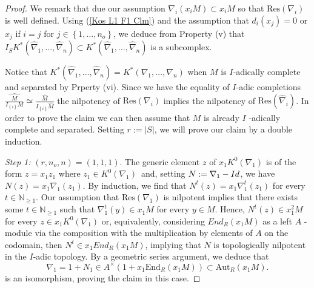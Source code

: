 \documentclass[10pt,a4paper]{amsart}
\begin{document}
\begin{proof} We remark that due our assumption $\nabla_i(x_i M)\subset x_i M$ so that $\mathrm{Res}(\nabla _{i})$ is well defined. Using (\ref{Kos L1 F1 Clm}) and the assumption that $ d_{i}\left( x_{j}\right) =0$ or $x_{j}$ if $i=j$ for $j\in \left\{ 1,\ldots,n_{o}\right\} $, we deduce from Property (v) that $I_{S}K^\ast\left( \widehat{\nabla }_{1},\ldots,\widehat{\nabla }
_{n}\right) \subset K^\ast\left( \widehat{\nabla }_{1},\ldots,\widehat{
\nabla }_{n}\right) $ is a subcomplex.  


Notice that  $K^\ast\left( \widehat{\nabla }_{1},\ldots,\widehat{\nabla }
_{n}\right) =K^\ast\left( \nabla _{1},\ldots,\nabla _{n}\right) $ when $M$
is $I$-adically complete and separated by Prperty (vi). Since we have the equality of $I$-adic completions $\widehat{\frac{M}{I_{\left\{
i\right\} }M}}\simeq \frac{\widehat{M}}{I_{\left\{ i\right\} } \widehat{M}}$
the nilpotency of $\mathrm{Res}\left( \nabla _{i}\right) $
implies the nilpotency of $\mathrm{Res}\left( \widehat{\nabla }_{i}\right) $. 
In order to prove the claim we can then assume that $M$ is already $I$
-adically complete and separated. Setting $r:=\left\vert S\right\vert $, we
will prove our claim by a double induction.

\emph{Step 1: }$\left( r,n_{o},n\right) =\left( 1,1,1\right) $. The generic
element $z$ of $x_{1}K^{0}\left( \nabla _{1}\right) $ is of the form $
z=x_{1}z_{1}$ where $z_{1}\in K^{0}\left( \nabla _{1}\right) $\ and, setting 
$N:=\nabla _{1}-{\rm Id}$, we have $N\left( z\right) =x_{1}\nabla _{1}\left( z_{1}\right) $. By
induction, we find that $N^{t}\left( z\right) =x_{1}\nabla _{1}^{t}\left(
z_{1}\right) $ for every $t\in \mathbb{N}_{\geq 1}$. Our assumption that $
\mathrm{Res}\left( \nabla _{1}\right) $ is nilpotent implies that there
exists some $t\in \mathbb{N}_{\geq 1}$ such that $\nabla _{1}^{t}\left(
y\right) \in x_{1}M$ for every $y\in M$. Hence, $N^{t}\left(
z\right) \in x_{1}^{2}M$ for every $z\in x_{1}K^{0}\left( \nabla _{1}\right) 
$ or, equivalently, considering $End_{R}\left( x_{1}M\right) $ as a left $A$
-module via the composition with the multiplication by elements of $A$ on
the codomain, then $N^{t}\in
x_{1}End_{R}\left( x_{1}M\right) $, implying that $N$ is topologically
nilpotent in the $I$-adic topology. By a geometric series argument, we deduce that
\begin{equation*}
\nabla _{1}=1+ N_1\in A^{\times }\left( 1+ x_1 \mathrm{End}_{R}\left(
x_{1}M\right) \right) \subset \mathrm{Aut}_{R}\left( x_{1}M\right) \text{.}
\end{equation*}
is an isomorphism, proving the claim in this case.


\end{proof}
\end{document}
